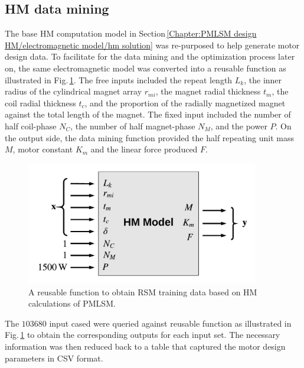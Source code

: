         \subsection{\acs{HM} data mining}           \label{Chapter:RSM/PMLSM/data mining}
        
        
            The base \acs{HM} computation model in Section\,\ref{Chapter:PMLSM design HM/electromagnetic model/hm solution} was re-purposed to help generate motor design data. To facilitate for the data mining and the optimization process later on, the same electromagnetic model was converted into a reusable function as illustrated in Fig.\,\ref{fig:chapter/rsm/PMLSM/mining process}. The free inputs included the repeat length $L_k$, the inner radius of the cylindrical magnet array $r_{mi}$, the magnet radial thickness $t_m$, the coil radial thickness $t_c$, and the proportion of the radially magnetized magnet against the total length of the magnet. The fixed input included the number of half coil-phase $N_C$, the number of half magnet-phase $N_M$, and the power $P$. On the output side, the data mining function provided the half repeating unit mass $M$, motor constant $K_m$ and the linear force produced $F$.
        
        
            \begin{figure}
                \centering
                \includegraphics[width=4in]{chap4/images/HM_mining_for_PMLSM.pdf}
                \caption{A reusable function to obtain \acs{RSM} training data based on \ac{HM} calculations of \ac{PMLSM}.}
                \label{fig:chapter/rsm/PMLSM/mining process}
            \end{figure}
            
            
            The $103680$ input cased were queried against reusable function as illustrated in Fig.\,\ref{fig:chapter/rsm/PMLSM/mining process} to obtain the corresponding outputs for each input set. The necessary information was then reduced back to a table that captured the motor design parameters in CSV format. 
            
